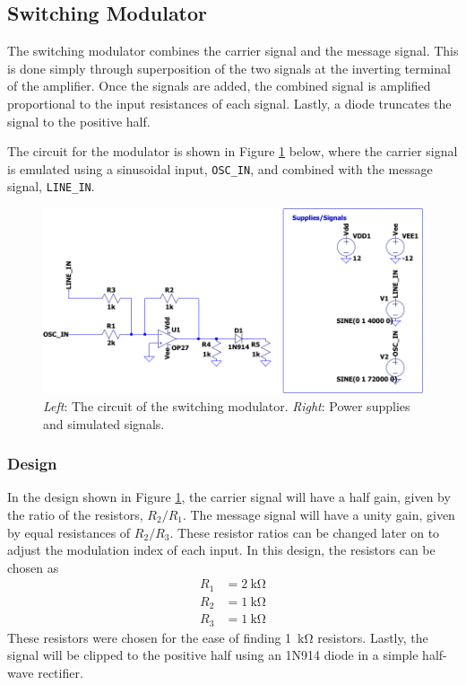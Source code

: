 \documentclass[11pt,letter,notitlepage]{article}
\begin{document}
	\clearpage %
	\subsection{Switching Modulator}
	The switching modulator combines the carrier signal and the message signal. This is done simply through superposition of the two signals at the inverting terminal of the amplifier. Once the signals are added, the combined signal is amplified proportional to the input resistances of each signal. Lastly, a diode truncates the signal to the positive half.
	
	The circuit for the modulator is shown in Figure \ref{fig:modckt-crop} below, where the carrier signal is emulated using a sinusoidal input, \texttt{OSC\_IN}, and combined with the message signal, \texttt{LINE\_IN}. 
	\begin{figure}[h]
		\centering
		\includegraphics[width=0.7\linewidth]{modulator/modckt-crop}
		\caption{\textit{Left}: The circuit of the switching modulator. \textit{Right}: Power supplies and simulated signals.}
		\label{fig:modckt-crop}
	\end{figure}
	\subsubsection{Design}
	In the design shown in Figure \ref{fig:modckt-crop}, the carrier signal will have a half gain, given by the ratio of the resistors, $R_2 / R_1$. The message signal will have a unity gain, given by equal resistances of $R_2 / R_3$. These resistor ratios can be changed later on to adjust the modulation index of each input. In this design, the resistors can be chosen as \begin{align*}
		R_1 & = \SI{2}{\kohm} \\
		R_2 & = \SI{1}{\kohm} \\
		R_3 & = \SI{1}{\kohm}
	\end{align*}
	These resistors were chosen for the ease of finding \SI{1}{\kohm} resistors. Lastly, the signal will be clipped to the positive half using an 1N914 diode in a simple half-wave rectifier. 
\end{document}
